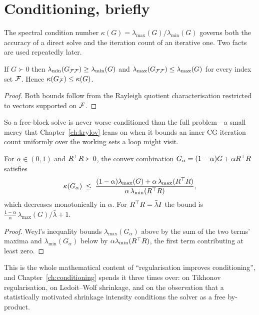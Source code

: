 \section{Conditioning, briefly}

The spectral condition number $\kappa(G) = \lambda_{\max}(G)/\lambda_{\min}(G)$
governs both the accuracy of a direct solve and the iteration count of an
iterative one. Two facts are used repeatedly later.

\begin{proposition}
\label{prop:interlace}
If $G \succ 0$ then $\lambda_{\min}(G_{\mathcal{F}\mathcal{F}}) \ge \lambda_{\min}(G)$ and
$\lambda_{\max}(G_{\mathcal{F}\mathcal{F}}) \le \lambda_{\max}(G)$ for every index set $\mathcal{F}$.
Hence $\kappa(G_{\mathcal{F}}) \le \kappa(G)$.
\end{proposition}

\begin{proof}
Both bounds follow from the Rayleigh quotient characterisation restricted to
vectors supported on $\mathcal{F}$.
\end{proof}

So a free-block solve is never worse conditioned than the full problem---a small
mercy that Chapter~\ref{ch:krylov} leans on when it bounds an inner CG iteration
count uniformly over the working sets a loop might visit.

\begin{proposition}
\label{prop:weyl}
For $\alpha \in (0,1)$ and $R^{\top} R \succ 0$, the convex combination
$G_\alpha = (1-\alpha)G + \alpha R^{\top} R$ satisfies
\[
  \kappa(G_\alpha) \;\le\;
  \frac{(1-\alpha)\lambda_{\max}(G) + \alpha\,\lambda_{\max}(R^{\top} R)}
       {\alpha\,\lambda_{\min}(R^{\top} R)},
\]
which decreases monotonically in $\alpha$. For $R^{\top} R = \bar\lambda I$ the bound is
$\tfrac{1-\alpha}{\alpha}\,\lambda_{\max}(G)/\bar\lambda + 1$.
\end{proposition}

\begin{proof}
Weyl's inequality \cite{hornjohnson2013} bounds $\lambda_{\max}(G_\alpha)$ above by
the sum of the two terms' maxima and $\lambda_{\min}(G_\alpha)$ below by
$\alpha\lambda_{\min}(R^{\top} R)$, the first term contributing at least zero.
\end{proof}

This is the whole mathematical content of ``regularisation improves conditioning'',
and Chapter~\ref{ch:conditioning} spends it three times over: on Tikhonov
regularisation, on Ledoit--Wolf shrinkage, and on the observation that a
statistically motivated shrinkage intensity conditions the solver as a free
by-product.


